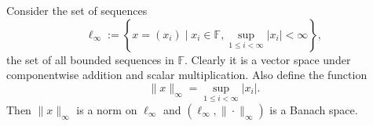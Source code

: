 \vspace{0.4cm}
\begin{eg}
    Consider the set of sequences $$\ell_{\infty}:=\left\{x=(x_{i})\mid x_{i}\in \mathbb{F}, \sup_{1\leq i<\infty}|x_{i}|<\infty\right\},$$ the set of all bounded sequences in $\mathbb{F}$. Clearly it is a vector space under componentwise addition and scalar multiplication. Also define the function $$\|x\|_{\infty}=\sup_{1\leq i<\infty}|x_{i}|.$$ Then $\|x\|_{\infty}$ is a norm on $\ell_{\infty}$ and $(\ell_{\infty},\|\cdot\|_{\infty})$ is a Banach space.
\end{eg}
\vspace{0.4cm}

